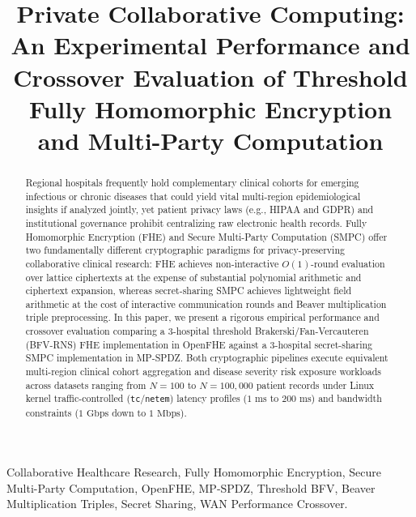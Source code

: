 \documentclass[conference]{IEEEtran}
\begin{document}
\title{Private Collaborative Computing: An Experimental Performance and Crossover Evaluation of Threshold Fully Homomorphic Encryption and Multi-Party Computation}

\author{
}

\maketitle

\begin{abstract}
Regional hospitals frequently hold complementary clinical cohorts for emerging infectious or chronic diseases that could yield vital multi-region epidemiological insights if analyzed jointly, yet patient privacy laws (e.g., HIPAA and GDPR) and institutional governance prohibit centralizing raw electronic health records. Fully Homomorphic Encryption (FHE) and Secure Multi-Party Computation (SMPC) offer two fundamentally different cryptographic paradigms for privacy-preserving collaborative clinical research: FHE achieves non-interactive $O(1)$-round evaluation over lattice ciphertexts at the expense of substantial polynomial arithmetic and ciphertext expansion, whereas secret-sharing SMPC achieves lightweight field arithmetic at the cost of interactive communication rounds and Beaver multiplication triple preprocessing. In this paper, we present a rigorous empirical performance and crossover evaluation comparing a 3-hospital threshold Brakerski/Fan-Vercauteren (BFV-RNS) FHE implementation in OpenFHE against a 3-hospital secret-sharing SMPC implementation in MP-SPDZ. Both cryptographic pipelines execute equivalent multi-region clinical cohort aggregation and disease severity risk exposure workloads across datasets ranging from $N=100$ to $N=100,000$ patient records under Linux kernel traffic-controlled (\texttt{tc}/\texttt{netem}) latency profiles ($1\text{ ms}$ to $200\text{ ms}$) and bandwidth constraints ($1\text{ Gbps}$ down to $1\text{ Mbps}$). %
\end{abstract}

\begin{IEEEkeywords}
Collaborative Healthcare Research, Fully Homomorphic Encryption, Secure Multi-Party Computation, OpenFHE, MP-SPDZ, Threshold BFV, Beaver Multiplication Triples, Secret Sharing, WAN Performance Crossover.
\end{IEEEkeywords}
\end{document}
